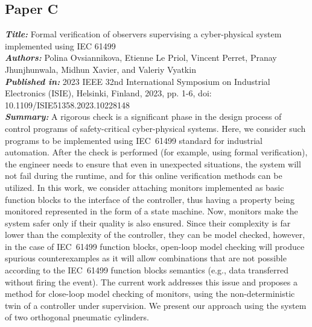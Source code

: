 \subsection{Paper C}
\textbf{\textit{Title:}} Formal verification of observers supervising a cyber-physical system implemented using IEC 61499\\
\textbf{\textit{Authors:}} Polina Ovsiannikova, Etienne Le Priol, Vincent Perret, Pranay Jhunjhunwala, Midhun Xavier, and Valeriy Vyatkin\\
\textbf{\textit{Published in:}} 2023 IEEE 32nd International Symposium on Industrial Electronics (ISIE), Helsinki, Finland, 2023, pp. 1-6, doi: 10.1109/ISIE51358.2023.10228148\\
\textbf{\textit{Summary:}} A rigorous check is a significant phase in the design process of control programs of safety-critical cyber-physical systems. Here, we consider such programs to be implemented using IEC~61499 standard for industrial automation. After the check is performed (for example, using formal verification), the engineer needs to ensure that even in unexpected situations, the system will not fail during the runtime, and for this online verification methods can be utilized. In this work, we consider attaching monitors implemented as basic function blocks to the interface of the controller, thus having a property being monitored represented in the form of a state machine. Now, monitors make the system safer only if their quality is also ensured. Since their complexity is far lower than the complexity of the controller, they can be model checked, however, in the case of IEC~61499 function blocks, open-loop model checking will produce spurious counterexamples as it will allow combinations that are not possible according to the IEC~61499 function blocks semantics (e.g., data transferred without firing the event). The current work addresses this issue and proposes a method for close-loop model checking of monitors, using the non-deterministic twin of a controller under supervision. We present our approach using the system of two orthogonal pneumatic cylinders.\\

